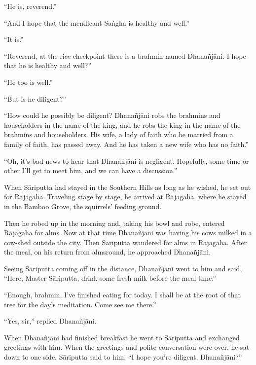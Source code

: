 \documentclass[12pt,openany]{book}%
\begin{document}
“He is, reverend.” 

“And I hope that the mendicant \textsanskrit{Saṅgha} is healthy and well.” 

“It is.” 

“Reverend, at the rice checkpoint there is a brahmin named \textsanskrit{Dhanañjāni}. I hope that he is healthy and well?” 

“He too is well.” 

“But is he diligent?” 

“How could he possibly be diligent? \textsanskrit{Dhanañjāni} robs the brahmins and householders in the name of the king, and he robs the king in the name of the brahmins and householders. His wife, a lady of faith who he married from a family of faith, has passed away. And he has taken a new wife who has no faith.” 

“Oh, it’s bad news to hear that \textsanskrit{Dhanañjāni} is negligent. Hopefully, some time or other I’ll get to meet him, and we can have a discussion.” 

When \textsanskrit{Sāriputta} had stayed in the Southern Hills as long as he wished, he set out for \textsanskrit{Rājagaha}. Traveling stage by stage, he arrived at \textsanskrit{Rājagaha}, where he stayed in the Bamboo Grove, the squirrels’ feeding ground. 

Then he robed up in the morning and, taking his bowl and robe, entered \textsanskrit{Rājagaha} for alms. Now at that time \textsanskrit{Dhanañjāni} was having his cows milked in a cow-shed outside the city. Then \textsanskrit{Sāriputta} wandered for alms in \textsanskrit{Rājagaha}. After the meal, on his return from almsround, he approached \textsanskrit{Dhanañjāni}. 

Seeing \textsanskrit{Sāriputta} coming off in the distance, \textsanskrit{Dhanañjāni} went to him and said, “Here, Master \textsanskrit{Sāriputta}, drink some fresh milk before the meal time.” 

“Enough, brahmin, I’ve finished eating for today. I shall be at the root of that tree for the day’s meditation. Come see me there.” 

“Yes, sir,” replied \textsanskrit{Dhanañjāni}. 

When \textsanskrit{Dhanañjāni} had finished breakfast he went to \textsanskrit{Sāriputta} and exchanged greetings with him. When the greetings and polite conversation were over, he sat down to one side. \textsanskrit{Sāriputta} said to him, “I hope you’re diligent, \textsanskrit{Dhanañjāni}?” 
\end{document}
